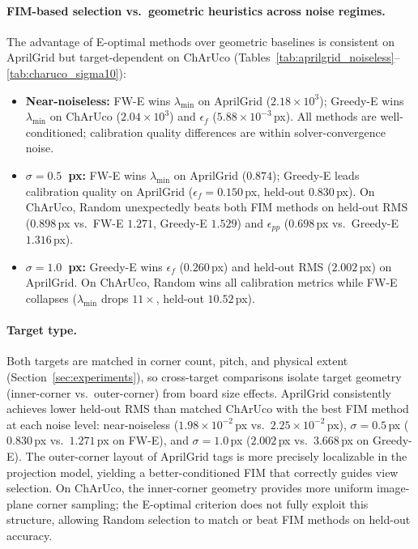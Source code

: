 \documentclass[11pt]{article}
\begin{document}
\paragraph{FIM-based selection vs.\ geometric heuristics across noise regimes.}
The advantage of E-optimal methods over geometric baselines is consistent on
AprilGrid but target-dependent on ChArUco
(Tables~\ref{tab:aprilgrid_noiseless}--\ref{tab:charuco_sigma10}):
\begin{itemize}
    \item \textbf{Near-noiseless:} FW-E wins $\lambda_{\min}$ on AprilGrid
    ($2.18\!\times\!10^3$); Greedy-E wins $\lambda_{\min}$ on ChArUco
    ($2.04\!\times\!10^3$) and $\epsilon_f$ ($5.88\!\times\!10^{-3}$\,px).
    All methods are well-conditioned; calibration quality differences are
    within solver-convergence noise.
    \item \textbf{$\sigma{=}0.5$~px:} FW-E wins $\lambda_{\min}$ on AprilGrid
    ($0.874$); Greedy-E leads calibration quality on AprilGrid
    ($\epsilon_f{=}0.150$\,px, held-out $0.830$\,px).
    On ChArUco, Random unexpectedly beats both FIM methods on held-out RMS
    ($0.898$\,px vs.\ FW-E $1.271$, Greedy-E $1.529$) and $\epsilon_{pp}$
    ($0.698$\,px vs.\ Greedy-E $1.316$\,px).
    \item \textbf{$\sigma{=}1.0$~px:} Greedy-E wins $\epsilon_f$ ($0.260$\,px)
    and held-out RMS ($2.002$\,px) on AprilGrid.
    On ChArUco, Random wins all calibration metrics while FW-E collapses
    ($\lambda_{\min}$ drops $11{\times}$, held-out $10.52$\,px).
\end{itemize}

\paragraph{Target type.}
Both targets are matched in corner count, pitch, and physical extent
(Section~\ref{sec:experiments}), so cross-target comparisons isolate
target geometry (inner-corner vs.\ outer-corner) from board size effects.
AprilGrid consistently achieves lower held-out RMS than matched ChArUco with
the best FIM method at each noise level: near-noiseless
($1.98\!\times\!10^{-2}$\,px vs.\ $2.25\!\times\!10^{-2}$\,px),
$\sigma{=}0.5$\,px ($0.830$\,px vs.\ $1.271$\,px on FW-E),
and $\sigma{=}1.0$\,px ($2.002$\,px vs.\ $3.668$\,px on Greedy-E).
The outer-corner layout of AprilGrid tags is more precisely localizable in
the projection model, yielding a better-conditioned FIM that correctly
guides view selection.
On ChArUco, the inner-corner geometry provides more uniform image-plane corner
sampling; the E-optimal criterion does not fully exploit this structure,
allowing Random selection to match or beat FIM methods on held-out accuracy.
\end{document}
